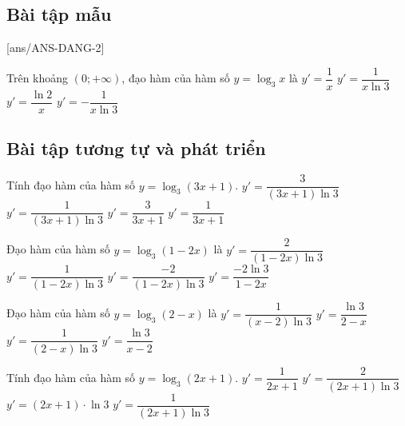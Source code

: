 \subsection{Bài tập mẫu}
[ans/ANS-DANG-2]
\begin{khung}
	\begin{vd}%
		Trên khoảng $(0; +\infty)$, đạo hàm của hàm số $y=\log_3 x$ là
		\choice
		{$y'=\dfrac{1}{x}$}
		{\True $y'=\dfrac{1}{x\ln3}$}
		{$y'=\dfrac{\ln2}x$}
		{$y'=-\dfrac{1}{x\ln3}$}
	\end{vd}
\end{khung}
\subsection{Bài tập tương tự và phát triển}
\begin{ex}%
	Tính đạo hàm của hàm số $y=\log_3(3x+1)$.
	\choice
	{\True $y'=\dfrac{3}{(3x+1)\ln{3}}$}
	{$y'=\dfrac{1}{(3x+1)\ln{3}}$}
	{$y'=\dfrac{3}{3x+1}$}
	{$y'=\dfrac{1}{3x+1}$}
\end{ex}

\begin{ex}%
	Đạo hàm của hàm số $y=\log_3\left(1-2x\right)$ là
	\choice
	{$y'=\dfrac{2}{(1-2x)\ln{3}}$}
	{$y'=\dfrac{1}{(1-2x)\ln{3}}$}
	{\True $y'=\dfrac{-2}{(1-2x)\ln{3}}$}
	{$y'=\dfrac{-2\ln{3}}{1-2x}$}
\end{ex}

\begin{ex}%
	Đạo hàm của hàm số $y=\log_3(2-x)$ là
	\choice
	{\True $y'=\dfrac{1}{(x-2)\ln 3}$}
	{$y'=\dfrac{\ln 3}{2-x}$}
	{$y'=\dfrac{1}{(2-x)\ln 3}$}
	{$y'=\dfrac{\ln 3}{x-2}$}
\end{ex}

\begin{ex}%
	Tính đạo hàm của hàm số $y=\log_3(2x+1)$.
	\choice
	{$y'=\dfrac{1}{2x+1}$}
	{\True $y'=\dfrac{2}{(2x+1)\ln 3}$}
	{$y'=(2x+1)\cdot \ln 3$}
	{$y'=\dfrac{1}{(2x+1)\ln 3}$}
\end{ex}

